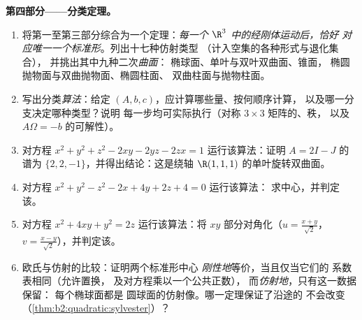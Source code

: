 \begin{problem}
\medskip
\noindent\textbf{第四部分——分类定理。}
\begin{enumerate}[resume]
  \item 将第一至第三部分综合为一个定理：\emph{每一个
        $\R^3$ 中的经刚体运动后，恰好
        对应唯一一个标准形}。列出十七种仿射类型
        （计入空集的各种形式与退化集合），
        并挑出其中九种二次\emph{曲面}：
        椭球面、单叶与双叶双曲面、锥面，
        椭圆抛物面与双曲抛物面、椭圆柱面、
        双曲柱面与抛物柱面。
  \item 写出分类\emph{算法}：给定 $(A,
        b, c)$，应计算哪些量、按何顺序计算，
        以及哪一分支决定哪种类型？说明
        每一步均可实际执行（对称
        $3\times3$ 矩阵的、秩，
        以及 $A\Omega = -b$ 的可解性）。
  \item 对方程 $x^2 + y^2 + z^2 - 2xy - 2yz -
        2zx = 1$ 运行该算法：证明 $A = 2I - J$ 的谱为 $\{2, 2,
        -1\}$，并得出结论：这是绕轴
        $\R(1,1,1)$ 的单叶旋转双曲面。
  \item 对方程 $x^2 + y^2 - z^2 - 2x + 4y + 2z + 4 = 0$ 运行该算法：
        求中心，并判定该。
  \item 对方程 $x^2 + 4xy + y^2 = 2z$ 运行该算法：将
        $xy$ 部分对角化（$u = \frac{x+y}{\sqrt2}$，$v =
        \frac{x-y}{\sqrt2}$），并判定该。
  \item 欧氏与仿射的比较：证明两个标准形中心
        \emph{刚性地}等价，当且仅当它们的
        系数表相同（允许置换，
        及对方程乘以一个公共正数），
        而\emph{仿射地}，只有这一数据保留：
        每个椭球面都是
        圆球面的仿射像。哪一定理保证了沿途的
        不会改变
        （\cref{thm:b2:quadratic:sylvester}）？
\end{enumerate}


\end{problem}
